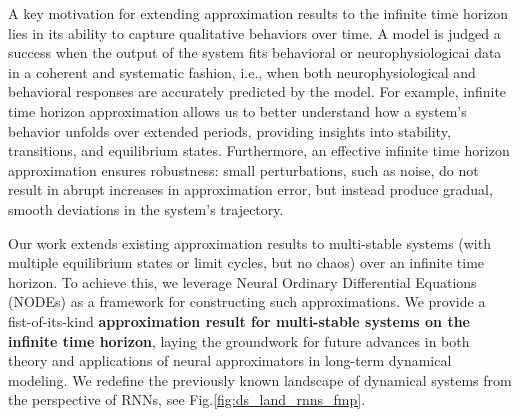 \documentclass{article}
\theoremstyle{definition} \newtheorem{definition}{Definition}
\theoremstyle{remark} \newtheorem{remark}{Remark}
\newcounter{ct}
\begin{document}
A key motivation for extending approximation results to the infinite time horizon lies in its ability to capture qualitative behaviors over time.
A model is judged a success when the output of the system fits behavioral or neurophysiologicai data in a coherent and systematic fashion, i.e., when both neurophysiological and behavioral responses are accurately predicted by the model.
 For example, infinite time horizon approximation allows us to better understand how a system's behavior unfolds over extended periods, providing insights into stability, transitions, and equilibrium states.
 Furthermore, an effective infinite time horizon approximation ensures robustness: small perturbations, such as noise, do not result in abrupt increases in approximation error, but instead produce gradual, smooth deviations in the system's trajectory.



Our work extends existing approximation results to multi-stable systems (with multiple equilibrium states or limit cycles, but no chaos) over an infinite time horizon. 
To achieve this, we leverage Neural Ordinary Differential Equations (NODEs) as a framework for constructing such approximations.
We provide a fist-of-its-kind \textbf{approximation result for multi-stable systems on the infinite time horizon}, laying the groundwork for future advances in both theory and applications of neural approximators in long-term dynamical modeling.
We redefine the previously known landscape of dynamical systems from the perspective of RNNs, see Fig.\ref{fig:ds_land_rnns_fmp}.


\end{document}
